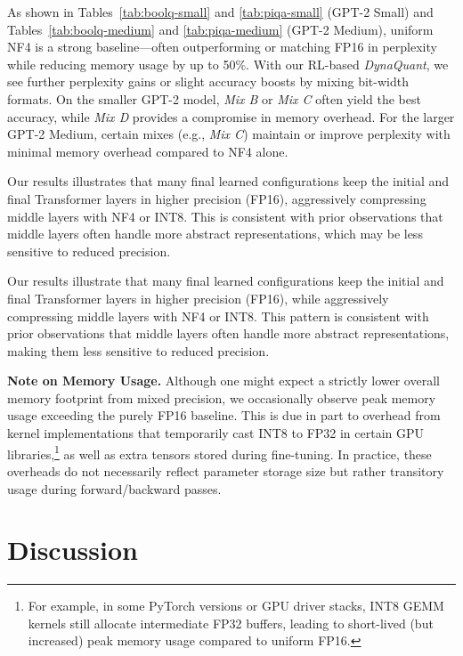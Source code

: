 \documentclass{article}
\begin{document}
	As shown in Tables~\ref{tab:boolq-small} and \ref{tab:piqa-small} (GPT-2 Small) and Tables~\ref{tab:boolq-medium} and \ref{tab:piqa-medium} (GPT-2 Medium), uniform NF4 is a strong baseline—often outperforming or matching FP16 in perplexity while reducing memory usage by up to 50\%. With our RL-based \emph{DynaQuant}, we see further perplexity gains or slight accuracy boosts by mixing bit-width formats. On the smaller GPT-2 model, \emph{Mix B} or \emph{Mix C} often yield the best accuracy, while \emph{Mix D} provides a compromise in memory overhead. For the larger GPT-2 Medium, certain mixes (e.g., \emph{Mix C}) maintain or improve perplexity with minimal memory overhead compared to NF4 alone.
	
	Our results illustrates that many final learned configurations keep the initial and final Transformer layers in higher precision (FP16), aggressively compressing middle layers with NF4 or INT8. This is consistent with prior observations \cite{wendler2024llamas} that middle layers often handle more abstract representations, which may be less sensitive to reduced precision.
	
	Our results illustrate that many final learned configurations keep the initial and final Transformer layers in higher precision (FP16), while aggressively compressing middle layers with NF4 or INT8. This pattern is consistent with prior observations \cite{wendler2024llamas} that middle layers often handle more abstract representations, making them less sensitive to reduced precision.
	
	\textbf{Note on Memory Usage.} Although one might expect a strictly lower overall memory footprint from mixed precision, we occasionally observe peak memory usage exceeding the purely FP16 baseline. This is due in part to overhead from kernel implementations that temporarily cast INT8 to FP32 in certain GPU libraries,\footnote{ For example, in some PyTorch versions or GPU driver stacks, INT8 GEMM kernels still allocate intermediate FP32 buffers, leading to short-lived (but increased) peak memory usage compared to uniform FP16.} as well as extra tensors stored during fine-tuning. In practice, these overheads do not necessarily reflect parameter storage size but rather transitory usage during forward/backward passes.
	
	\section{Discussion}
	\label{sec:discussion}
	
\end{document}
